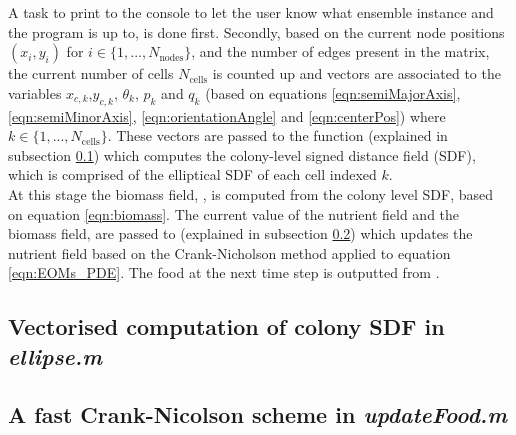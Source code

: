 A task to print to the console to let the user know what ensemble instance
and  the program is up to, is done first.
Secondly, based on the current node positions $(x_i,y_i)$ for
$i \in \{1, ..., N_{\textrm{nodes}}\}$, and the number
of edges present in the  matrix, the current number of cells
$N_{\textrm{cells}}$ is counted up
and vectors are associated to the variables $x_{c,k}$,$y_{c,k}$,
$\theta_k$, $p_k$ and $q_k$ (based on equations
 \ref{eqn:semiMajorAxis}, \ref{eqn:semiMinorAxis},
\ref{eqn:orientationAngle} and \ref{eqn:centerPos}) where $k \in \{1, ..., N_{\textrm{cells}}\}$.
These vectors are passed to the function  (explained in 
subsection \ref{ssec:ellipse})
which computes the colony-level signed distance field (SDF),
which is comprised of the elliptical SDF of each cell indexed $k$.
\\

At this stage the biomass field, , is computed 
from the colony level SDF, based on equation \ref{eqn:biomass}.
The current value of the nutrient field and the biomass field,
are passed to  (explained in 
subsection \ref{ssec:updateFood}) which updates the nutrient field
based on the Crank-Nicholson method applied to equation \ref{eqn:EOMs_PDE}.
The food at the next time step is outputted from .


\subsection{Vectorised computation of colony SDF in \textit{ellipse.m}}\label{ssec:ellipse}


\subsection{A fast Crank-Nicolson scheme in \textit{updateFood.m}}\label{ssec:updateFood}







